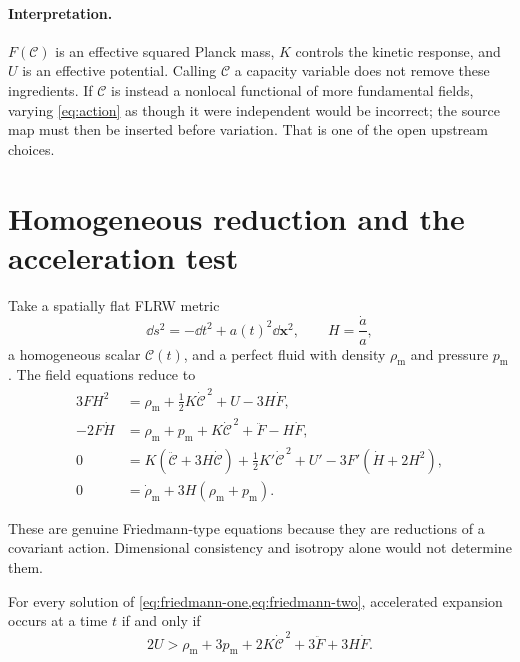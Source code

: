 \documentclass[11pt]{article}
\newcommand{\CC}{\mathcal C}
\begin{document}
\paragraph{Interpretation.}
$F(\CC)$ is an effective squared Planck mass, $K$ controls the kinetic
response, and $U$ is an effective potential.  Calling $\CC$ a capacity
variable does not remove these ingredients.  If $\CC$ is instead a
nonlocal functional of more fundamental fields, varying
\cref{eq:action} as though it were independent would be incorrect; the
source map must then be inserted before variation.  That is one of the
open upstream choices.

\section{Homogeneous reduction and the acceleration test}

Take a spatially flat FLRW metric
\[
 \dd s^2=-\dd t^2+a(t)^2\dd\mathbf x^2,
 \qquad H=\frac{\dot a}{a},
\]
a homogeneous scalar $\CC(t)$, and a perfect fluid with density
$\rho_{\mathrm m}$ and pressure $p_{\mathrm m}$.  The field equations
reduce to
\begin{align}
 3F H^2
 &=
 \rho_{\mathrm m}
 +\frac{1}{2}K\dot{\CC}^{\,2}
 +U
 -3H\dot F,
 \label{eq:friedmann-one}\\
 -2F\dot H
 &=
 \rho_{\mathrm m}+p_{\mathrm m}
 +K\dot{\CC}^{\,2}
 +\ddot F-H\dot F,
 \label{eq:friedmann-two}\\
 0
 &=
 K(\ddot{\CC}+3H\dot{\CC})
 +\frac{1}{2}K'\dot{\CC}^{\,2}
 +U'
 -3F'(\dot H+2H^2),
 \label{eq:scalar-flrw}\\
 0
 &=
 \dot\rho_{\mathrm m}
 +3H(\rho_{\mathrm m}+p_{\mathrm m}).
 \label{eq:matter-continuity}
\end{align}
\par\medskip\noindent
These are genuine Friedmann-type equations because they are reductions
of a covariant action.  Dimensional consistency and isotropy alone would
not determine them.

\begin{theorem}
\label{thm:acceleration}
For every solution of
\cref{eq:friedmann-one,eq:friedmann-two}, accelerated expansion occurs
at a time $t$ if and only if
\begin{equation}
 2U
 >
 \rho_{\mathrm m}+3p_{\mathrm m}
 +2K\dot{\CC}^{\,2}
 +3\ddot F+3H\dot F.
 \label{eq:acceleration-condition}
\end{equation}
\end{theorem}
\end{document}
